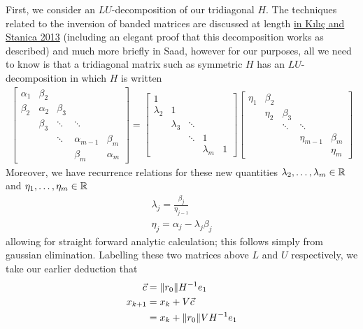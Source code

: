 \documentclass[11pt]{article}
\begin{document}
First, we consider an $LU$-decomposition of our tridiagonal $H$. The techniques related to the inversion of banded matrices are discussed at length \hyperlink{https://doi.org/10.1016/j.cam.2012.07.018}{in Kılıç and Stanica 2013} (including an elegant proof that this decomposition works as described) and much more briefly in Saad, however for our purposes, all we need to know is that a tridiagonal matrix such as symmetric $H$ has an $LU$-decomposition in which $H$ is written\begin{gather*}
 \begin{bmatrix} \alpha_1 & \beta_2 & & & \\ \beta_2 & \alpha_2 & \beta_3 & & \\ & \beta_3 & \ddots & \ddots & \\ & & \ddots & \alpha_{m-1} & \beta_m \\ & & & \beta_m & \alpha_m \end{bmatrix} = 
\begin{bmatrix} 1 &  & & & \\ \lambda_2 & 1 &  & & \\ & \lambda_3 & \ddots & & \\ & & \ddots & 1 &  \\ & & & \lambda_m & 1 \end{bmatrix}
\begin{bmatrix} \eta_1 & \beta_2 & & & \\  & \eta_2 & \beta_3 & & \\ &  & \ddots & \ddots & \\ & & & \eta_{m-1} & \beta_m \\ & & &  & \eta_m \end{bmatrix}
\end{gather*}
Moreover, we have recurrence relations for these new quantities $\lambda_2,\dots, \lambda_m \in \mathbb{R}$ and $\eta_1,\dots, \eta_m \in \mathbb{R}$ \begin{gather*}
\lambda_j = \frac{\beta_j}{\eta_{j-1}} \\
\eta_j = \alpha_j - \lambda_j \beta_j
\end{gather*}
allowing for straight forward analytic calculation; this follows simply from gaussian elimination. Labelling these two matrices above $L$ and $U$ respectively, we take our earlier deduction that \begin{align*}
\vec c &= \lVert r_0 \rVert H^{-1} e_1 \\
x_{k+1} &= x_k + V \vec c \\
&= x_k + \lVert r_0 \rVert V H^{-1} e_1
\end{align*}
\end{document}
